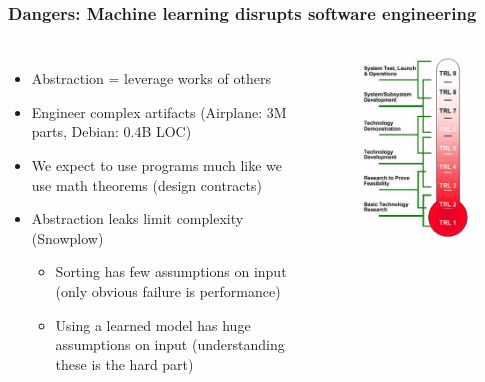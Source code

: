 \documentclass{beamer}
\begin{document}
\begin{frame}
	\frametitle{Dangers: Machine learning disrupts software engineering}
	
	\begin{columns}
		\centering
		\begin{itemize}
			\item Abstraction = leverage works of others
			\item Engineer complex artifacts (Airplane: 3M parts, Debian: 0.4B LOC)
			\item We expect to use programs much like we use math theorems (design contracts)
			\item Abstraction leaks limit complexity (Snowplow)
			\begin{itemize}
				\item Sorting has few assumptions on input (only obvious failure is performance)
				\item Using a learned model has huge assumptions on input (understanding these is the hard part)
			\end{itemize}
		\end{itemize}
		\centering
		\begin{figure}
			\includegraphics[width=1\linewidth]{NASA_TRL_Meter}

\end{figure}
\end{columns}
\end{frame}
\end{document}
